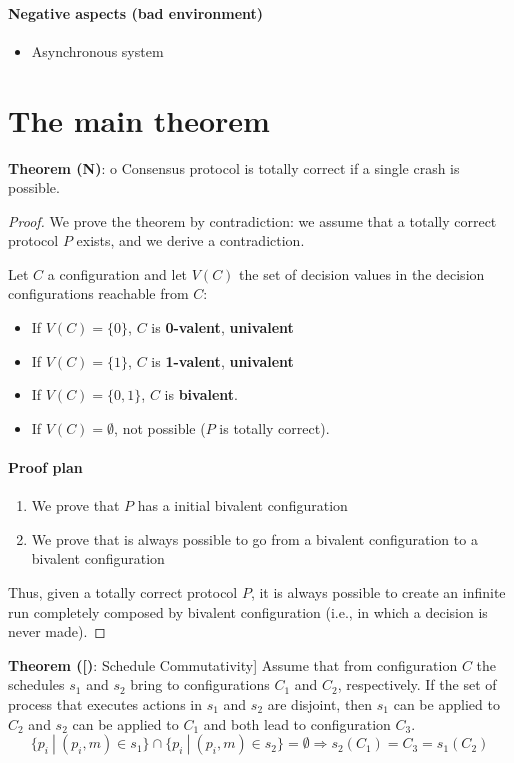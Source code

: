 \documentclass[12pt]{article}
\newcommand{\BI}{\begin{itemize}}
\newcommand{\EI}{\end{itemize}}
\newcommand{\BE}{\begin{enumerate}}
\newcommand{\EE}{\end{enumerate}}
\newenvironment{theorem}[1]{\textbf{Theorem (#1)}: }{\medskip}
\newenvironment{lemma}[1]{\textbf{Theorem (#1)}: }{\medskip}
\begin{document}
\paragraph*{Negative aspects (bad environment)}
\BI
\item Asynchronous system
\EI

\section*{The main theorem}

\begin{theorem}
No Consensus protocol is totally correct if a single crash is possible.
\end{theorem}

\begin{proof}
We prove the theorem by contradiction: we assume that a totally correct 
protocol $P$ exists, and we derive a contradiction.

Let $C$ a configuration and let $V(C)$ the set of decision values in
the decision configurations reachable from $C$:
\BI
\item If $V(C) = \{ 0 \}$, $C$ is {\bf 0-valent}, {\bf univalent}
\item If $V(C) = \{ 1 \}$, $C$ is {\bf 1-valent}, {\bf univalent}
\item If $V(C) = \{ 0,1 \}$, $C$ is {\bf bivalent}.
\item If $V(C) = \emptyset$, not possible ($P$ is totally correct).
\EI

\paragraph{Proof plan}

\BE
\item We prove that $P$ has a initial bivalent configuration
\item We prove that is always possible to go from a bivalent configuration to 
  a bivalent configuration
\EE
Thus, given a totally correct protocol $P$, it is always possible to 
create an infinite run completely composed by bivalent configuration
(i.e., in which a decision is never made).

\end{proof}


\begin{lemma}[Schedule Commutativity]
Assume that from configuration $C$ the schedules
$s_1$ and $s_2$ bring to configurations $C_1$ and $C_2$,
respectively. If the set of process that executes actions in
$s_1$ and $s_2$ are disjoint, then $s_1$ can be applied to $C_2$
and $s_2$ can be applied to $C_1$ and both lead to configuration
$C_3$.
\[
  \{ p_i ~|~ (p_i, m) \in s_1 \} \cap \{ p_i ~|~ (p_i, m) \in s_2 \} = \emptyset \Rightarrow s_2(C_1) = C_3 = s_1(C_2)
\]
\end{lemma}
\end{document}
